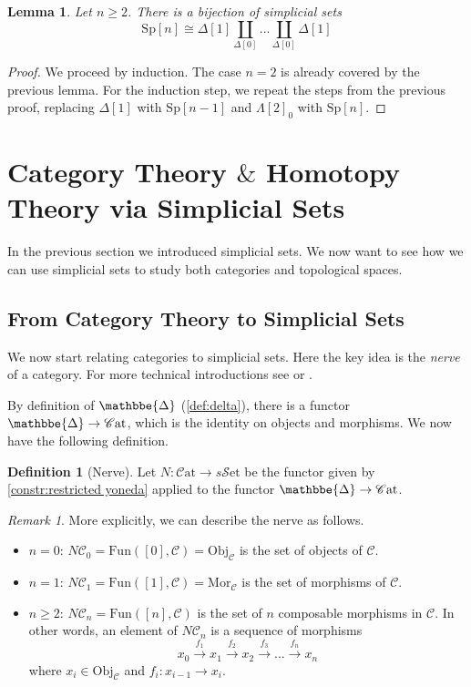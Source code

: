 \documentclass[11pt, a4paper]{amsart}
\def\DDelta{{\mathbbe{\Delta}}}
\newcommand{\DD}{\DDelta}
\newcommand{\cC}{\mathcal{C}}
\newcommand{\Mor}{\mathrm{Mor}}
\newcommand{\Fun}{\mathrm{Fun}}
\newcommand{\sSet}{s\mathscr{S}\mathrm{et}}
\newcommand{\Cat}{\mathscr{C}\mathrm{at}}
\newcommand{\Obj}{\mathrm{Obj}}
\newcommand{\Sp}{\mathrm{Sp}}
\newtheorem{lemma}[equation]{Lemma}
\theoremstyle{definition}
\newtheorem{definition}[equation]{Definition}
\theoremstyle{remark}
\newtheorem{remark}[equation]{Remark}
\numberwithin{equation}{section}
\begin{document}
\begin{lemma} \label{lemma:spine colimit}
 Let $n \geq 2$. There is a bijection of simplicial sets 
 \[\Sp[n] \cong \Delta[1] \coprod_{\Delta[0]} ... \coprod_{\Delta[0]} \Delta[1] \]
\end{lemma}

\begin{proof}
 We proceed by induction. The case $n =2$ is already covered by the previous lemma. For the induction step, we repeat the steps from the previous proof, replacing $\Delta[1]$ with $\Sp[n-1]$ and $\Lambda[2]_0$ with $\Sp[n]$.
\end{proof}

\section{Category Theory \texorpdfstring{$\&$}{\&} Homotopy Theory via Simplicial Sets} \label{sec:ct ht via ss}
In the previous section we introduced simplicial sets. We now want to see how we can use simplicial sets to study both categories and topological spaces.

\subsection{From Category Theory to Simplicial Sets} \label{subsec:ct to ss}
We now start relating categories to simplicial sets. Here the key idea is the \emph{nerve} of a category. For more technical introductions see \cite[Section 4]{rezk2022qcats} or \cite[\href{https://kerodon.net/tag/002M}{Subsection 002M}]{lurie2026kerodon}.

By definition of $\DD$ (\cref{def:delta}), there is a functor $\DD \to \Cat$, which is the identity on objects and morphisms. We now have the following definition.

\begin{definition}[Nerve] \label{def:nerve}
  Let $N\colon \Cat \to \sSet$ be the functor given by \cref{constr:restricted yoneda} applied to the functor $\DD \to \Cat$.
\end{definition}

\begin{remark} \label{rem:nerve explicit}
  More explicitly, we can describe the nerve as follows. 
  \begin{itemize}
    \item $n = 0$: $N\cC_0 = \Fun([0],\cC) = \Obj_{\cC}$ is the set of objects of $\cC$.
    \item $n = 1$: $N\cC_1 = \Fun([1],\cC) = \Mor_{\cC}$ is the set of morphisms of $\cC$.
    \item $n \geq 2$: $N\cC_n = \Fun([n],\cC)$ is the set of $n$ composable morphisms in $\cC$. In other words, an element of $N\cC_n$ is a sequence of morphisms
    \[x_0 \xrightarrow{f_1} x_1 \xrightarrow{f_2} x_2 \xrightarrow{f_3} ... \xrightarrow{f_n} x_n\]
    where $x_i \in \Obj_\cC$ and $f_i\colon x_{i-1} \to x_i$.
  \end{itemize}
\end{remark}
\end{document}
